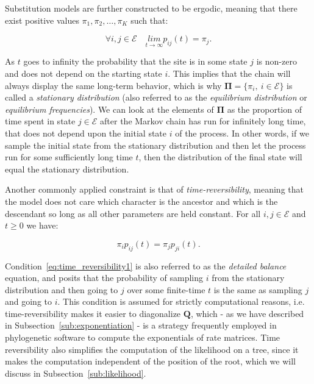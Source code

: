 Substitution models are further constructed to be ergodic, meaning that there exist positive values $\pi_{1},\pi_{2},\ldots,\pi_{K}$ such that:

\begin{equation}
\forall i,j\in \mathcal{E}  \quad\underset{t\rightarrow\infty}{lim}p_{ij}(t)=\pi_{j}.
\label{eq:ergodicity}
\end{equation}


As $t$ goes to infinity the probability that the site is in some state $j$ is non-zero and does not depend on the starting state $i$.
This implies that the chain will always display the same long-term behavior, which is why $\mathbf{\Pi}=\{\pi_{i},\ i\in\mathcal{E}\}$ is called a \emph{stationary distribution} (also referred to as the \emph{equilibrium distribution} or \emph{equilibrium frequencies}).
We can look at the elements of $\mathbf{\Pi}$ as the proportion of time spent in state $j\in\mathcal{E}$ after the Markov chain has run for infinitely long time, that does not depend upon the initial state $i$ of the process.
In other words, if we sample the initial state from the stationary distribution and then let the process run for some sufficiently long time $t$, then the distribution of the final state will equal the stationary distribution. 

Another commonly applied constraint is that of \emph{time-reversibility}, meaning that the model does not care which character is the ancestor and which is the descendant so long as all other parameters are held constant.
For all $i,j\in \mathcal{E}$ and $t\geq 0$ we have:

\begin{equation}
\pi_{i}p_{ij}(t)=\pi_{j}p_{ji}(t).
\label{eq:time_reversibility1}
\end{equation}

\noindent
Condition~\ref{eq:time_reversibility1} is also referred to as the \emph{detailed balance} equation, and posits that the probability of sampling $i$ from the stationary distribution and then going to $j$ over some finite-time $t$ is the same as sampling $j$ and going to $i$. 
% 
% 
This condition is assumed for strictly computational reasons, i.e. time-reversibility makes it easier to diagonalize $\mathbf{Q}$, which - as we have described in 
Subsection~\ref{sub:exponentiation} - is a strategy frequently employed in phylogenetic software to compute the exponentials of rate matrices.
Time reversibility also simplifies the computation of the likelihood on a tree, since it makes the computation independent of the position of the root, which we will discuss in Subsection~\ref{sub:likelihood}.










